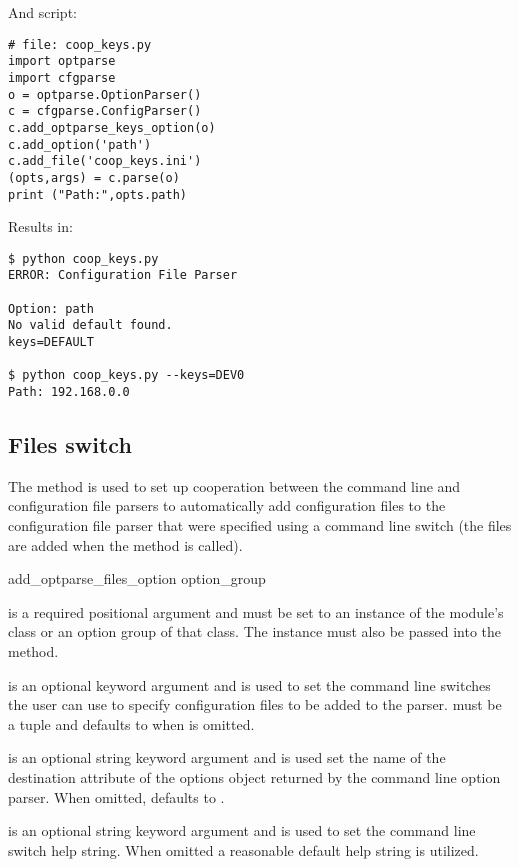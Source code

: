 \documentclass{howto}
\begin{document}
And script:

\begin{verbatim}
# file: coop_keys.py
import optparse
import cfgparse
o = optparse.OptionParser()
c = cfgparse.ConfigParser()
c.add_optparse_keys_option(o)
c.add_option('path')
c.add_file('coop_keys.ini')
(opts,args) = c.parse(o)
print ("Path:",opts.path)
\end{verbatim}

Results in:

\begin{verbatim}
$ python coop_keys.py
ERROR: Configuration File Parser

Option: path
No valid default found.
keys=DEFAULT

$ python coop_keys.py --keys=DEV0
Path: 192.168.0.0
\end{verbatim}

\subsection{Files switch\label{cfgparse-coop-files}}
        
The 
method is used to set up cooperation between the command line and 
configuration file parsers to automatically add configuration files
to the configuration file parser that were specified using a command
line switch (the files are added when the  method is called).

  \begin{funcdesc}{add_optparse_files_option}{
          option_group
          }

     is a required positional argument and must be set to 
        an instance of the  module's  
        class or an option group of that class.  The  
        instance must also be passed into the  method.
        
     is an optional keyword argument and is used to set
        the command line switches the user can use to specify configuration 
        files to be added to the parser.   must be a tuple and 
        defaults to  when  is omitted.
        
     is an optional string keyword argument and is used set the 
        name of the destination attribute of the options object returned
        by the command line option parser.  When omitted,  defaults
        to .
        
     is an optional string keyword argument and is used to set
        the command line switch help string.  When omitted a reasonable 
        default help string is utilized.
  
  \end{funcdesc}
\end{document}

